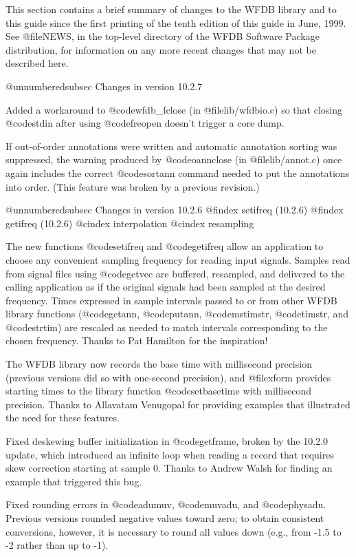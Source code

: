 This section contains a brief summary of changes to the WFDB library and
to this guide since the first printing of the tenth edition of this
guide in June, 1999.  See @file{NEWS}, in the top-level directory of the
WFDB Software Package distribution, for information on any more recent
changes that may not be described here.

@unnumberedsubsec Changes in version 10.2.7

Added a workaround to @code{wfdb_fclose} (in @file{lib/wfdbio.c}) so that
closing @code{stdin} after using @code{freopen} doesn't trigger a core dump.

If out-of-order annotations were written and automatic annotation sorting was
suppressed, the warning produced by @code{oannclose} (in @file{lib/annot.c})
once again includes the correct @code{sortann} command needed to put the
annotations into order.  (This feature was broken by a previous revision.)

@unnumberedsubsec Changes in version 10.2.6
@findex setifreq (10.2.6)
@findex getifreq (10.2.6)
@cindex interpolation
@cindex resampling

The new functions @code{setifreq} and @code{getifreq} allow an
application to choose any convenient sampling frequency for reading
input signals.  Samples read from signal files using @code{getvec} are
buffered, resampled, and delivered to the calling application as if the
original signals had been sampled at the desired frequency.  Times
expressed in sample intervals passed to or from other WFDB library
functions (@code{getann}, @code{putann}, @code{mstimstr}, @code{timstr},
and @code{strtim}) are rescaled as needed to match intervals
corresponding to the chosen frequency.  Thanks to Pat Hamilton for the
inspiration!

The WFDB library now records the base time with millisecond precision
(previous versions did so with one-second precision), and @file{xform}
provides starting times to the library function @code{setbasetime} with
millisecond precision.  Thanks to Allavatam Venugopal for providing
examples that illustrated the need for these features.

Fixed deskewing buffer initialization in @code{getframe}, broken by the
10.2.0 update, which introduced an infinite loop when reading a record
that requires skew correction starting at sample 0.  Thanks to Andrew
Walsh for finding an example that triggered this bug.

Fixed rounding errors in @code{adumuv}, @code{muvadu}, and @code{physadu}.
Previous versions rounded negative values toward zero;  to obtain consistent
conversions, however, it is necessary to round all values down (e.g., from
-1.5 to -2 rather than up to -1).

